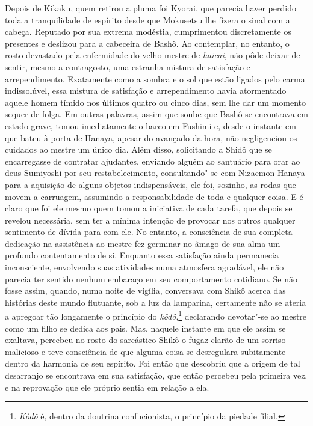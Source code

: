 Depois de Kikaku, quem retirou a pluma foi Kyorai, que parecia haver
perdido toda a tranquilidade de espírito desde que Mokusetsu lhe fizera
o sinal com a cabeça. Reputado por sua extrema modéstia, cumprimentou
discretamente os presentes e deslizou para a cabeceira de Bashô. Ao
contemplar, no entanto, o rosto devastado pela enfermidade do velho
mestre de \emph{haicai}, não pôde deixar de sentir, mesmo a contragosto, uma
estranha mistura de satisfação e arrependimento. Exatamente como a
sombra e o sol que estão ligados pelo carma indissolúvel, essa mistura
de satisfação e arrependimento havia atormentado aquele homem tímido
nos últimos quatro ou cinco dias, sem lhe dar um momento sequer de
folga. Em outras palavras, assim que soube que Bashô se encontrava em
estado grave, tomou imediatamente o barco em Fushimi e, desde o
instante em que bateu à porta de Hanaya, apesar do avançado da hora,
não negligenciou os cuidados ao mestre um único dia. Além disso,
solicitando a Shidô que se encarregasse de contratar ajudantes,
enviando alguém ao santuário para orar ao deus Sumiyoshi por seu
restabelecimento, consultando"-se com Nizaemon Hanaya para a aquisição
de alguns objetos indispensáveis, ele foi, sozinho, as rodas que movem 
a carruagem, assumindo a responsabilidade de toda e
qualquer coisa. E é claro que foi ele mesmo quem tomou a iniciativa de
cada tarefa, que depois se revelou necessária, sem ter a mínima
intenção de provocar nos outros qualquer sentimento de dívida para com
ele. No entanto, a consciência de sua completa dedicação na assistência
ao mestre fez germinar no âmago de sua alma um profundo contentamento
de si. Enquanto essa satisfação ainda permanecia inconsciente,
envolvendo suas atividades numa atmosfera agradável, ele não parecia
ter sentido nenhum embaraço em seu comportamento cotidiano. Se não
fosse assim, quando, numa noite de vigília, conversava com Shikô acerca
das histórias deste  mundo flutuante, sob a luz da lamparina,
certamente não se ateria a apregoar tão longamente o princípio do
\textit{kôdô},\footnote{ \textit{Kôdô} é, dentro da doutrina
confucionista, o princípio da piedade filial.} declarando
devotar"-se ao mestre como um filho se dedica aos pais. Mas, naquele
instante em que ele assim se exaltava, percebeu no rosto do sarcástico
Shikô o fugaz clarão de um sorriso malicioso e teve consciência de que
alguma coisa se desregulara subitamente dentro da harmonia de seu
espírito. Foi então que descobriu que a origem de tal desarranjo se
encontrava em sua satisfação, que então percebeu pela primeira vez, e
na reprovação que ele próprio sentia em relação a ela.

